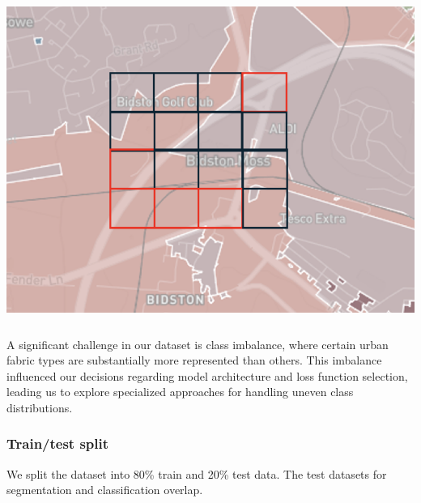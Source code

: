 \documentclass[
  letterpaper,
  DIV=11,
  numbers=noendperiod]{scrartcl}
\begin{document}
\begin{center}
\includegraphics[width=\textwidth,height=4.16667in]{../figures/algo_design/sampling.png}
\end{center}

A significant challenge in our dataset is class imbalance, where certain
urban fabric types are substantially more represented than others. This
imbalance influenced our decisions regarding model architecture and loss
function selection, leading us to explore specialized approaches for
handling uneven class distributions.

\subsubsection{Train/test split}\label{traintest-split}

We split the dataset into 80\% train and 20\% test data. The test
datasets for segmentation and classification overlap.
\end{document}
